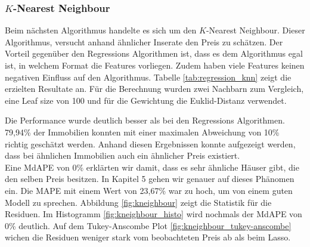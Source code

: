 \subsubsection{$K$-Nearest Neighbour}
\label{chapter:KNN}
Beim nächsten Algorithmus handelte es sich um den $K$-Nearest Neighbour. Dieser Algorithmus, versucht anhand ähnlicher Inserate den Preis zu schätzen. Der Vorteil gegenüber den Regressions Algorithmen ist, dass es dem Algorithmus egal ist, in welchem Format die Features vorliegen. Zudem haben viele Features keinen negativen Einfluss auf den Algorithmus.
Tabelle \ref{tab:regression_knn} zeigt die erzielten Resultate an. Für die Berechnung wurden zwei Nachbarn zum Vergleich, eine Leaf size von 100 und für die Gewichtung die Euklid-Distanz verwendet.

\begin{table}[ht]
\centering
{}
\caption{Ergebnisse von $K$-Nearest Neighbour}
\label{tab:regression_knn}
\end{table}

Die Performance wurde deutlich besser als bei den Regressions Algorithmen. 79,94\% der Immobilien konnten mit einer maximalen Abweichung von 10\% richtig geschätzt werden. Anhand diesen Ergebnissen konnte aufgezeigt werden, dass bei ähnlichen Immobilien auch ein ähnlicher Preis existiert.\\
Eine MdAPE von 0\% erklärten wir damit, dass es sehr ähnliche Häuser gibt, die den selben Preis besitzen. In Kapitel 5 gehen wir genauer auf dieses Phänomen ein. Die MAPE mit einem Wert von 23,67\% war zu hoch, um von einem guten Modell zu sprechen. Abbildung \ref{fig:kneighbour} zeigt die Statistik für die Residuen. Im Histogramm \ref{fig:kneighbour_histo} wird nochmals der MdAPE von 0\% deutlich. Auf dem Tukey-Anscombe Plot \ref{fig:kneighbour_tukey-anscombe} wichen die Residuen weniger stark vom beobachteten Preis ab als beim Lasso.

